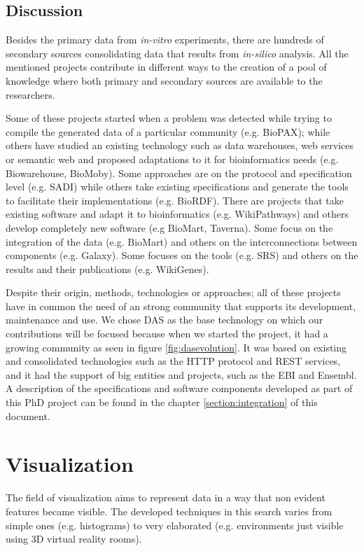 \subsection{Discussion}
Besides the primary data from \emph{in-vitro} experiments, there are hundreds of secondary sources consolidating data that results from \emph{in-silico} analysis. All the mentioned projects contribute in different ways to the creation of a pool of knowledge where both primary and secondary sources are available to the researchers.

Some of these projects started when a problem was detected while trying to compile the generated data of a particular community (e.g. BioPAX); while others have studied an existing technology such as data warehouses, web services or semantic web and proposed adaptations to it for bioinformatics needs (e.g. Biowarehouse, BioMoby). Some approaches are on the protocol and specification level (e.g. SADI) while others take existing specifications and generate the tools to facilitate their implementations (e.g. BioRDF). There are projects that take existing software and adapt it to bioinformatics (e.g. WikiPathways) and others develop completely new software (e.g BioMart, Taverna). Some focus on the integration of the data (e.g. BioMart) and others on the interconnections between components (e.g. Galaxy). Some focuses on the tools (e.g. SRS) and others on the results and their publications (e.g. WikiGenes). 

Despite their origin, methods, technologies or approaches; all of these projects have in common the need of an strong community that supports its development, maintenance and use. We chose DAS as the base technology on which our contributions will be focused because when we started the project, it had a growing community as seen in figure \ref{fig:dasevolution}. It was based on existing and consolidated technologies such as the HTTP protocol and REST services, and it had the support of big entities and projects, such as the EBI and Ensembl. A description of the specifications and software components developed as part of this PhD project can be found in the chapter \ref{section:integration} of this document.

\newpage
\section{Visualization}
The field of visualization aims to represent data in a way that non evident features became visible. The developed techniques in this search varies from simple ones (e.g. histograms) to very elaborated (e.g. environments just visible using 3D virtual reality rooms).

